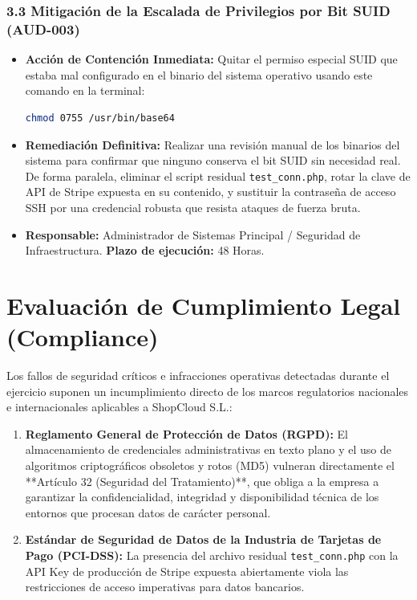 \documentclass[11pt,a4paper]{report}
\begin{document}
\subsection*{3.3 Mitigación de la Escalada de Privilegios por Bit SUID (AUD-003)}
\begin{itemize}
    \item \textbf{Acción de Contención Inmediata:} Quitar el permiso especial SUID que estaba mal configurado en el binario del sistema operativo usando este comando en la terminal:
    \begin{lstlisting}[language=bash]
    chmod 0755 /usr/bin/base64
    \end{lstlisting}
    \item \textbf{Remediación Definitiva:} Realizar una revisión manual de los binarios del sistema para confirmar que ninguno conserva el bit SUID sin necesidad real. De forma paralela, eliminar el script residual \texttt{test\_conn.php}, rotar la clave de API de Stripe expuesta en su contenido, y sustituir la contraseña de acceso SSH por una credencial robusta que resista ataques de fuerza bruta.
    \item \textbf{Responsable:} Administrador de Sistemas Principal / Seguridad de Infraestructura. \textbf{Plazo de ejecución:} 48 Horas.
\end{itemize}


\chapter{Evaluación de Cumplimiento Legal (Compliance)}

Los fallos de seguridad críticos e infracciones operativas detectadas durante el ejercicio suponen un incumplimiento directo de los marcos regulatorios nacionales e internacionales aplicables a ShopCloud S.L.:

\begin{enumerate}
    \item \textbf{Reglamento General de Protección de Datos (RGPD):} El almacenamiento de credenciales administrativas en texto plano y el uso de algoritmos criptográficos obsoletos y rotos (MD5) vulneran directamente el **Artículo 32 (Seguridad del Tratamiento)**, que obliga a la empresa a garantizar la confidencialidad, integridad y disponibilidad técnica de los entornos que procesan datos de carácter personal.
    \item \textbf{Estándar de Seguridad de Datos de la Industria de Tarjetas de Pago (PCI-DSS):} La presencia del archivo residual \texttt{test\_conn.php} con la API Key de producción de Stripe expuesta abiertamente viola las restricciones de acceso imperativas para datos bancarios.
\end{enumerate}
\end{document}
